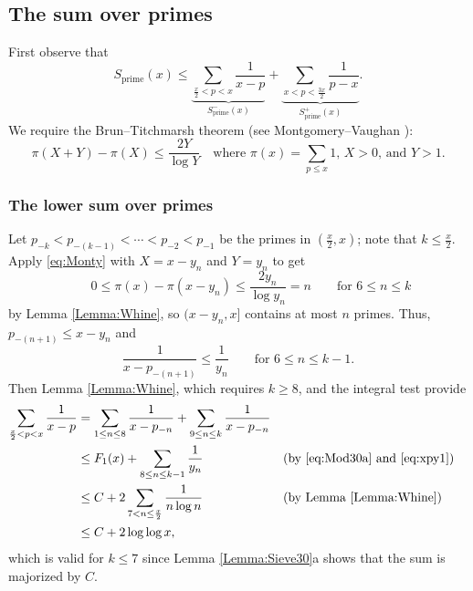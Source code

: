 \documentclass[10pt,reqno]{amsart}
\theoremstyle{plain}
\theoremstyle{definition}
\begin{document}
\subsection{The sum over primes}\label{Subsection:PrimeSum}
First observe that
\begin{equation*}
    S_{\mathrm{prime}}(x)
    \leq \underbrace{\sum_{\frac{x}{2} < p < x}  \frac{1}{  x-p } }_{S_{\mathrm{prime}}^-(x)}
    + \underbrace{\sum_{x < p < \frac{3x}{2}}  \frac{1}{ p-x}  }_{S_{\mathrm{prime}}^+(x)}.
\end{equation*}
We require the Brun--Titchmarsh theorem (see Montgomery--Vaughan \cite[Cor.~2]{MontgomeryVaughan}):
\begin{equation}\label{eq:Monty}
    \pi(X+Y) - \pi(X) \leq \frac{2Y}{\log{Y}}\quad\text{where $\pi(x) = \sum_{p\leq x}1$, $X > 0$, and $Y > 1$}.
\end{equation}


\subsubsection{The lower sum over primes}

Let $p_{-k} < p_{-(k-1)} < \cdots < p_{-2} < p_{-1}$
be the primes in $(\frac{x}{2}, x)$; note that $k \leq \frac{x}{2}$.
Apply \eqref{eq:Monty} with $X = x-y_n$ and $Y = y_n$ to get
\begin{equation*}\qquad
0 \leq \pi(x) - \pi(x-y_n) \leq \frac{2y_n}{\log y_n} = n \qquad \text{for $6 \leq n \leq k$}
\end{equation*}
by Lemma \ref{Lemma:Whine}, so $(x-y_n,x]$ contains at most $n$ primes.
Thus, $p_{-(n+1)} \leq x - y_n$ and
\begin{equation}\label{eq:xpy1}
\frac{1}{x-p_{-(n+1)}} \leq \frac{1}{y_n} \qquad \text{for $6 \leq n \leq k-1$}.
\end{equation}
Then Lemma \ref{Lemma:Whine}, which requires $k \geq 8$, and the integral test provide
\begin{align*}
\sum_{ \frac{x}{2} < p < x}  \frac{1}{  x-p }
&=\sum_{ 1 \leq n\leq 8} \frac{1}{  x-p_{-n} } + \sum_{9 \leq n \leq k}  \frac{1}{  x-p_{-n} } \\
&\leq F_1(x) + \sum_{8\leq n \leq k-1} \frac{1}{y_n} && (\text{by \eqref{eq:Mod30a} and \eqref{eq:xpy1}})\\
&\leq C + 2 \sum_{7 < n \leq \frac{x}{2}} \frac{1}{n \log n} && (\text{by Lemma \ref{Lemma:Whine}})\\
&\leq C +  2 \log \log x,
\end{align*}
which is valid for $k \leq 7$ since Lemma \ref{Lemma:Sieve30}a shows that the sum is majorized by $C$.
\end{document}
